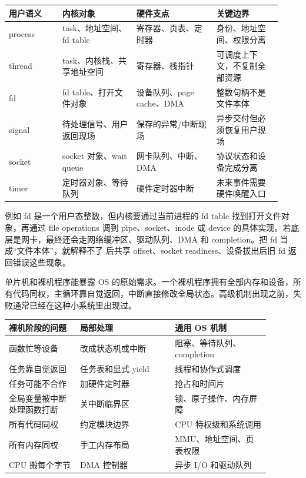 \begin{longtable}{|L{0.18\linewidth}|L{0.25\linewidth}|L{0.27\linewidth}|L{0.22\linewidth}|}
\toprule
用户语义 & 内核对象 & 硬件支点 & 关键边界 \\
\midrule
process & task、地址空间、fd table & 寄存器、页表、定时器 & 身份、地址空间、权限分离 \\\tablerowrule
thread & task、内核栈、共享地址空间 & 寄存器、栈指针 & 可调度上下文，不复制全部资源 \\\tablerowrule
fd & fd table、打开文件对象 & 设备队列、page cache、DMA & 整数句柄不是文件本体 \\\tablerowrule
signal & 待处理信号、用户返回现场 & 保存的异常/中断现场 & 异步交付但必须恢复用户现场 \\\tablerowrule
socket & socket 对象、wait queue & 网卡队列、中断、DMA & 协议状态和设备完成分离 \\\tablerowrule
timer & 定时器对象、等待队列 & 硬件定时器中断 & 未来事件需要硬件唤醒入口 \\
\bottomrule
\end{longtable}

例如 fd 是一个用户态整数，但内核要通过当前进程的 fd table 找到打开文件对象，再通过 file operations 调到 pipe、socket、inode 或 device 的具体实现。若底层是网卡，最终还会走网络缓冲区、驱动队列、DMA 和 completion。把 fd 当成“文件本体”，就解释不了  后共享 offset、socket readiness、设备拔出后旧 fd 返回错误这些现象。

单片机和裸机程序能暴露 OS 的原始需求。一个裸机程序拥有全部内存和设备，所有代码同权，主循环靠自觉返回，中断直接修改全局状态。高级机制出现之前，失败通常已经在这种小系统里出现过。

\begin{longtable}{|p{0.24\linewidth}|p{0.32\linewidth}|p{0.32\linewidth}|}
\toprule
裸机阶段的问题 & 局部处理 & 通用 OS 机制 \\
\midrule
函数忙等设备 & 改成状态机或中断 & 阻塞、等待队列、completion \\\tablerowrule
任务靠自觉返回 & 任务表和显式 yield & 线程和协作式调度 \\\tablerowrule
任务可能不合作 & 加硬件定时器 & 抢占和时间片 \\\tablerowrule
全局变量被中断处理函数打断 & 关中断临界区 & 锁、原子操作、内存屏障 \\\tablerowrule
所有代码同权 & 约定模块边界 & CPU 特权级和系统调用 \\\tablerowrule
所有内存同权 & 手工内存布局 & MMU、地址空间、页表权限 \\\tablerowrule
CPU 搬每个字节 & DMA 控制器 & 异步 I/O 和驱动队列 \\
\bottomrule
\end{longtable}

